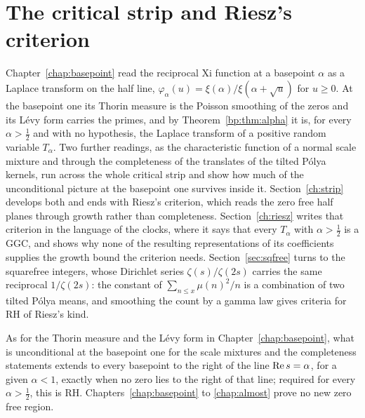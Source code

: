 \chapter{The critical strip and Riesz's criterion}\label{chap:strip}

Chapter~\ref{chap:basepoint} read the reciprocal Xi function at a basepoint $\alpha$ as a Laplace transform on the half line, $\varphi_\alpha(u)=\xi(\alpha)/\xi(\alpha+\sqrt u)$ for $u\ge0$. At the basepoint one its Thorin measure is the Poisson smoothing of the zeros and its L\'evy form carries the primes, and by Theorem~\ref{bp:thm:alpha} it is, for every $\alpha>\frac12$ and with no hypothesis, the Laplace transform of a positive random variable $T_\alpha$. Two further readings, as the characteristic function of a normal scale mixture and through the completeness of the translates of the tilted P\'olya kernels, run across the whole critical strip and show how much of the unconditional picture at the basepoint one survives inside it. Section~\ref{ch:strip} develops both and ends with Riesz's criterion, which reads the zero free half planes through growth rather than completeness. Section~\ref{ch:riesz} writes that criterion in the language of the clocks, where it says that every $T_\alpha$ with $\alpha>\frac12$ is a GGC, and shows why none of the resulting representations of its coefficients supplies the growth bound the criterion needs. Section~\ref{sec:sqfree} turns to the squarefree integers, whose Dirichlet series $\zeta(s)/\zeta(2s)$ carries the same reciprocal $1/\zeta(2s)$: the constant of $\sum_{n\le x}\mu(n)^2/n$ is a combination of two tilted P\'olya means, and smoothing the count by a gamma law gives criteria for RH of Riesz's kind.

As for the Thorin measure and the L\'evy form in Chapter~\ref{chap:basepoint}, what is unconditional at the basepoint one for the scale mixtures and the completeness statements extends to every basepoint to the right of the line $\operatorname{Re} s=\alpha$, for a given $\alpha<1$, exactly when no zero lies to the right of that line; required for every $\alpha>\frac12$, this is RH. Chapters~\ref{chap:basepoint} to \ref{chap:almost} prove no new zero free region.
